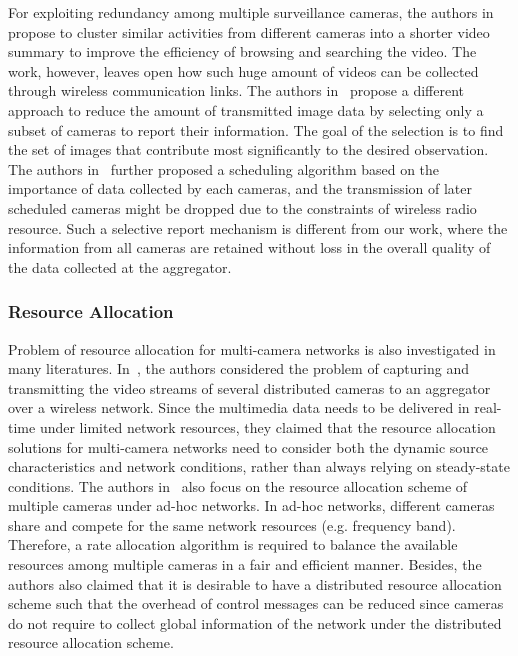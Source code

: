 For exploiting redundancy among multiple surveillance cameras, the authors in~\cite{ClusteredSynopsis} propose to cluster similar activities from different cameras into a shorter video summary to improve the efficiency of browsing and searching the video.
The work, however, leaves open how such huge amount of videos can be collected through wireless communication links.
The authors in~\cite{CameraSelection} propose a different approach to reduce the amount of transmitted image data by selecting only a subset of cameras to report their information.
The goal of the selection is to find the set of images that contribute most significantly to the desired observation.
The authors in~\cite{CorrAwareScheduling} further proposed a scheduling algorithm based on the importance of data collected by each cameras, and the transmission of later scheduled cameras might be dropped due to the constraints of wireless radio resource.
Such a selective report mechanism is different from our work, where the information from all cameras are retained without loss in the overall quality of the data collected at the aggregator.
%
\subsubsection{Resource Allocation}
Problem of resource allocation for multi-camera networks is also investigated in many literatures.
%
In~\cite{MWSNresourceAllocation}, the authors considered the problem of capturing and transmitting the video streams of several distributed cameras to an aggregator  over a wireless network.
Since the multimedia data needs to be delivered in real-time under limited network resources, they claimed that the resource allocation solutions for multi-camera networks need to consider both the dynamic source characteristics and network conditions, rather than always relying on steady-state conditions.
%
The authors in~\cite{rateAllocationForVideo} also focus on the resource allocation scheme of multiple cameras under ad-hoc networks.
In ad-hoc networks, different cameras share and compete for the same network resources (e.g. frequency band).
Therefore, a rate allocation algorithm is required to balance the available resources among multiple cameras in a fair and efficient manner.
Besides, the authors also claimed that it is desirable to have a distributed resource allocation scheme such that the overhead of control messages can be reduced since cameras do not require to collect global information of the network under the distributed resource allocation scheme.
%

